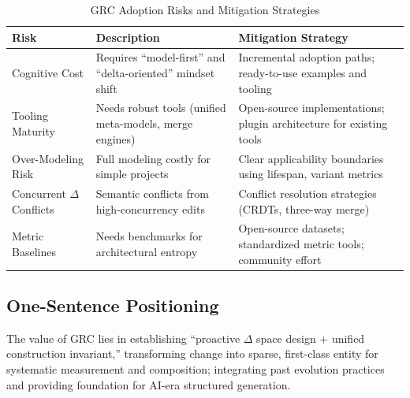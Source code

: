\documentclass[11pt]{article}
\begin{document}
\begin{table}[htbp]
\centering
\caption{GRC Adoption Risks and Mitigation Strategies}
\label{tab:risks}
\begin{tabular}{|p{}|p{}|p{}|}
\hline
\textbf{Risk} & \textbf{Description} & \textbf{Mitigation Strategy} \\
\hline
Cognitive Cost & Requires ``model-first'' and ``delta-oriented'' mindset shift & Incremental adoption paths; ready-to-use examples and tooling \\
\hline
Tooling Maturity & Needs robust tools (unified meta-models, merge engines) & Open-source implementations; plugin architecture for existing tools \\
\hline
Over-Modeling Risk & Full modeling costly for simple projects & Clear applicability boundaries using lifespan, variant metrics \\
\hline
Concurrent $\Delta$ Conflicts & Semantic conflicts from high-concurrency edits & Conflict resolution strategies (CRDTs, three-way merge) \\
\hline
Metric Baselines & Needs benchmarks for architectural entropy & Open-source datasets; standardized metric tools; community effort \\
\hline
\end{tabular}
\end{table}

\subsection{One-Sentence Positioning}
\label{subsec:positioning}

The value of GRC lies in establishing ``proactive $\Delta$ space design + unified construction invariant,'' transforming change into sparse, first-class entity for systematic measurement and composition; integrating past evolution practices and providing foundation for AI-era structured generation.
\end{document}
